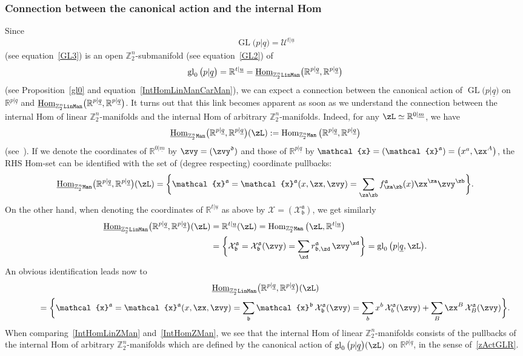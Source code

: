 \documentclass[pdftex]{sigma}%
\newcommand{\op}[1]{\operatorname{#1}}
\newcommand{\R}{{\mathbb R}}
\newcommand{\Z}{{\mathbb Z}}
\def\ul{\underline}
\def\ul{\underline}
\newcommand{\0}{\otimes}
\newcommand{\z}{\Z_2^n}
\numberwithin{equation}{section}
\begin{document}
\subsubsection{Connection between the canonical action and the internal Hom} Since
\[
\op{GL}\big(p|\ul q\big)=\mathcal{U}^{t|\ul u}
\]
(see equation~\eqref{GL3}) is an open $\z$-submanifold (see equation~\eqref{GL2}) of
\[
\op{gl}_0\big(p|\ul q\big)=\R^{t|\ul u}=\ul{\op{Hom}}_{\z{\tt LinMan}}\big(\R^{p|\ul q},\R^{p|\ul q}\big)
\]
(see Proposition~\ref{gl0} and equation~\eqref{IntHomLinManCarMan}), we can expect a connection between the canonical action of $\op{GL}\big(p|\ul q\big)$ on $\R^{p|\ul q}$ and $\ul{\op{Hom}}_{\z{\tt LinMan}}\big(\R^{p|\ul q},\R^{p|\ul q}\big)$. It turns out that this link becomes apparent as soon as we understand the connection between the internal Hom of linear $\z$-manifolds and the internal Hom of arbitrary $\z$-manifolds. Indeed, for any $\zL\simeq\R^{0|\ul m}$, we have
\[
\ul{\op{Hom}}_{\z{\tt Man}}\big(\R^{p|\ul q},\R^{p|\ul q}\big)(\zL):=\op{Hom}_{\z{\tt Man}}\big(\R^{p|\ul q},\R^{p|\ul q}\big)
\]
(see~\cite{Bruce:2019b}). If we denote the coordinates of $\R^{0|\ul m}$ by $\zvy=(\zvy^{\mathfrak{d}})$ and those of $\R^{p|\ul q}$ by $\mathcal{x}=(\mathcal{x}^{\mathfrak{a}})=\big(x^a,\zx^A\big)$, the {\small RHS} Hom-set can be identified with the set of (degree respecting) coordinate pullbacks:
\[
\ul{\op{Hom}}_{\z{\tt Man}}\big(\R^{p|\ul q},\R^{p|\ul q}\big)(\zL)=\bigg\{\mathcal{x}^{\mathfrak{a}}=\mathcal{x}^{\mathfrak{a}}(x,\zx,\zvy) =\sum_{\za\zb}f^{\mathfrak{a}}_{\za\zb}(x)\zx^\za\zvy^\zb\bigg\}.
\]
On the other hand, when denoting the coordinates of $\R^{t|\ul u}$ as above by $\mathcal{X}=(\mathcal{X}^{\mathfrak{a}}_{\mathfrak{b}})$, we get similarly
\begin{align}
\ul{\op{Hom}}_{\z{\tt LinMan}}\big(\R^{p|\ul q},\R^{p|\ul q}\big)(\zL)&=\R^{t|\ul u}(\zL)=\op{Hom}_{\z{\tt Man}}\big(\zL,\R^{t|\ul u}\big)\nonumber
\\
&=\bigg\{\mathcal{X}^{\mathfrak{a}}_{\mathfrak{b}}=\mathcal{X}^{\mathfrak{a}}_{\mathfrak{b}}(\zvy)=\sum_\zd r^{\mathfrak{a}}_{\mathfrak{b},\zd}\,\zvy^\zd\bigg\}
=\op{gl}_0\big(p|\ul q,\zL\big).\label{IntHomZMan}
\end{align}
An obvious identification leads now to
\begin{gather}
\ul{\op{Hom}}_{\z{\tt LinMan}}\big(\R^{p|\ul q},\R^{p|\ul q}\big)(\zL)\nonumber
\\ \qquad
{}=\bigg\{\mathcal{x}^{\mathfrak{a}}=\mathcal{x}^{\mathfrak{a}}(x,\zx,\zvy)
=\sum_{\mathfrak{b}}\mathcal{x}^{\mathfrak{b}}\,\mathcal{X}^{\mathfrak{a}}_{\mathfrak{b}}(\zvy)=
\sum_{b}x^b\,\mathcal{X}^{\mathfrak{a}}_{b}(\zvy)+\sum_B\zx^B\,\mathcal{X}^{\mathfrak{a}}_{B}(\zvy)\bigg\}.
\label{IntHomLinZMan}
\end{gather}
When comparing~\eqref{IntHomLinZMan} and~\eqref{IntHomZMan}, we see that the internal Hom of linear $\z$-manifolds consists of the pullbacks of the internal Hom of arbitrary $\z$-manifolds which are defined by the canonical action of $\op{gl}_0\big(p|\ul q\big)(\zL)$ on $\R^{p|\ul q}$, in the sense of~\eqref{zActGLR}.
\end{document}

